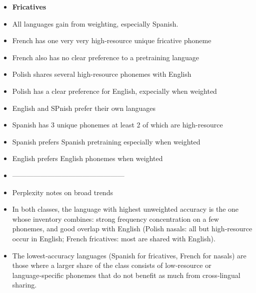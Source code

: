\begin{itemize}
    \item \textbf{Fricatives}
    \item All languages gain from weighting, especially Spanish.
    \item French has one very very high-resource unique fricative phoneme 
    \item French also has no clear preference to a pretraining language
    \item Polish shares several high-resource phonemes with English
    \item Polish has a clear preference for English, expecially when weighted
    \item English and SPnish prefer their own languages
    \item Spanish has 3 unique phonemes at least 2 of which are high-resource
    \item Spanish prefers Spanish pretraining especially when weighted
    \item English prefers English phonemes when weighted

    \item ------------------------------------------------
    \item Perplexity notes on broad trends
    \item In both classes, the language with highest unweighted accuracy is the one whose inventory combines: strong frequency concentration on a few phonemes, and good overlap with English (Polish nasals: all but high‑resource \textipa{|[{n}} occur in English; French fricatives: most are shared with English).
    \item The lowest‑accuracy languages (Spanish for fricatives, French for nasals) are those where a larger share of the class consists of low‑resource or language‑specific phonemes that do not benefit as much from cross‑lingual sharing.
    
\end{itemize}
\fi



\iffalse

